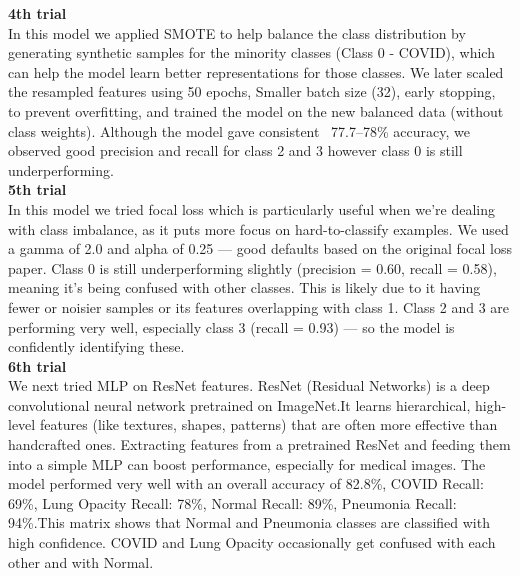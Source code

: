 \documentclass{article}
\begin{document}
\textbf{4th trial}\\
In this model we applied SMOTE to help balance the class distribution by generating synthetic samples for the minority classes (Class 0 - COVID), which can help the model learn better representations for those classes. We later scaled the resampled features using 50 epochs, Smaller batch size (32), early stopping, to prevent overfitting, and trained the model on the new balanced data (without class weights). Although the model gave consistent ~77.7–78\% accuracy, we observed good precision and recall for class 2 and 3 however class 0 is still underperforming.\\

\textbf{5th trial}\\
In this model we tried focal loss which is particularly useful when we're dealing with class imbalance, as it puts more focus on hard-to-classify examples. We used a gamma of 2.0 and alpha of 0.25 — good defaults based on the original focal loss paper. Class 0 is still underperforming slightly (precision = 0.60, recall = 0.58), meaning it's being confused with other classes. This is likely due to it having fewer or noisier samples or its features overlapping with class 1. Class 2 and 3 are performing very well, especially class 3 (recall = 0.93) — so the model is confidently identifying these.\\

\textbf{6th trial}\\
We next tried MLP on ResNet features. ResNet (Residual Networks) is a deep convolutional neural network pretrained on ImageNet.It learns hierarchical, high-level features (like textures, shapes, patterns) that are often more effective than handcrafted ones. Extracting features from a pretrained ResNet and feeding them into a simple MLP can boost performance, especially for medical images.
The model performed very well with an overall accuracy of 82.8\%, COVID Recall: 69\%, Lung Opacity Recall: 78\%, Normal Recall: 89\%, Pneumonia Recall: 94\%.This matrix shows that Normal and Pneumonia classes are classified with high confidence. COVID and Lung Opacity occasionally get confused with each other and with Normal.
\end{document}
